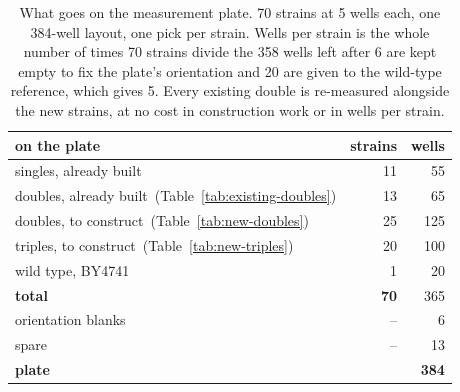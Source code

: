 \begin{table}[H]\centering
\small
\caption[]{What goes on the measurement plate. 70 strains at 5 wells each, one 384-well layout, one pick per strain. Wells per strain is the whole number of times 70 strains divide the 358 wells left after 6 are kept empty to fix the plate's orientation and 20 are given to the wild-type reference, which gives 5. Every existing double is re-measured alongside the new strains, at no cost in construction work or in wells per strain.}\label{tab:plate}
\begin{tabular}{lrr}
\toprule
on the plate & strains & wells \\
\midrule
singles, already built & 11 & 55 \\
doubles, already built~(Table~\ref{tab:existing-doubles}) & 13 & 65 \\
doubles, to construct~(Table~\ref{tab:new-doubles}) & 25 & 125 \\
triples, to construct~(Table~\ref{tab:new-triples}) & 20 & 100 \\
wild type, BY4741 & 1 & 20 \\
\midrule
\textbf{total} & \textbf{70} & 365 \\
orientation blanks & -- & 6 \\
spare & -- & 13 \\
\midrule
\textbf{plate} &  & \textbf{384} \\
\bottomrule
\end{tabular}
\end{table}
